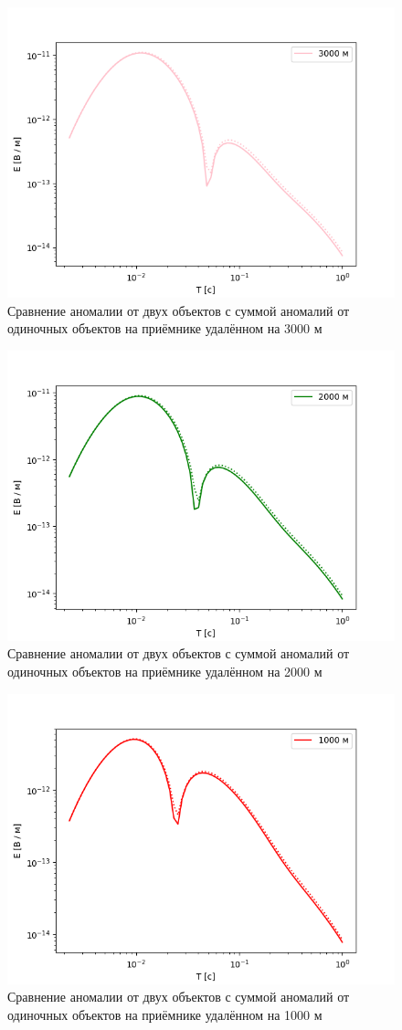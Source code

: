 \begin{figure}
	\centering
	\vspace*{0.7cm}
	\includegraphics[width=0.7\linewidth]{images/Log_E_compare_3000.png}
	\caption{Сравнение аномалии от двух объектов с суммой аномалий от одиночных объектов на приёмнике удалённом на 3000 м}
	\label{fig:LogE_isolated_1}
\end{figure} 

\begin{figure}
	\centering
	\vspace*{0.7cm}
	\includegraphics[width=0.7\linewidth]{images/Log_E_compare_2000.png}
	\caption{Сравнение аномалии от двух объектов с суммой аномалий от одиночных объектов на приёмнике удалённом на 2000 м}
	\label{fig:LogE_isolated_2}
\end{figure} 

\begin{figure}
	\centering
	\vspace*{0.7cm}
	\includegraphics[width=0.7\linewidth]{images/Log_E_compare_1000.png}
	\caption{Сравнение аномалии от двух объектов с суммой аномалий от одиночных объектов на приёмнике удалённом на 1000 м}
	\label{fig:LogE_isolated_3}
\end{figure} 


